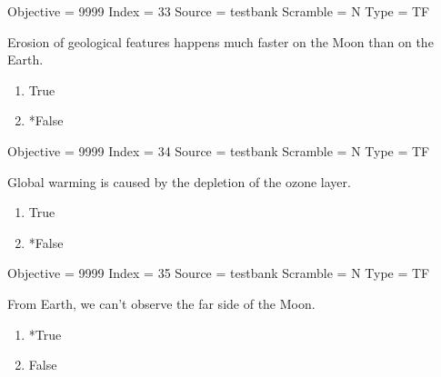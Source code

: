 \documentclass[11pt]{article}
\begin{document}
\begin{enumerate}
\begin{minipage}{\textwidth}
\begin{minipage}{\textwidth}
Objective = 9999
Index = 33
Source = testbank
Scramble = N
Type = TF
\end{minipage}
\end{minipage}
\vskip 0.20in

\begin{minipage}{\textwidth}
\begin{minipage}{\textwidth}
\item Erosion of geological features happens much faster on the Moon than on the Earth.
\begin{multicols}{3}
\begin{enumerate} 
\setlength{\itemsep}{1pt} 
\setlength{\parskip}{0pt} 
\setlength{\parsep}{0pt}
\setlength{\multicolsep}{1pt} 
\item True
\item *False
\end{enumerate} 
\vfill 
\end{multicols}

Objective = 9999
Index = 34
Source = testbank
Scramble = N
Type = TF
\end{minipage}
\end{minipage}
\vskip 0.20in

\begin{minipage}{\textwidth}
\begin{minipage}{\textwidth}
\item Global warming is caused by the depletion  of the ozone layer.
\begin{multicols}{3}
\begin{enumerate} 
\setlength{\itemsep}{1pt} 
\setlength{\parskip}{0pt} 
\setlength{\parsep}{0pt}
\setlength{\multicolsep}{1pt} 
\item True
\item *False
\end{enumerate} 
\vfill 
\end{multicols}

Objective = 9999
Index = 35
Source = testbank
Scramble = N
Type = TF
\end{minipage}
\end{minipage}
\vskip 0.20in

\begin{minipage}{\textwidth}
\begin{minipage}{\textwidth}
\item From Earth, we can't observe the far side of the Moon.
\begin{multicols}{3}
\begin{enumerate} 
\setlength{\itemsep}{1pt} 
\setlength{\parskip}{0pt} 
\setlength{\parsep}{0pt}
\setlength{\multicolsep}{1pt} 
\item *True
\item False
\end{enumerate} 
\vfill 
\end{multicols}


\end{minipage}
\end{minipage}
\end{enumerate}
\end{document}
